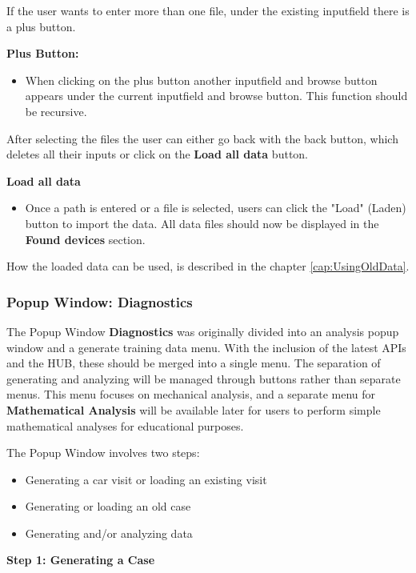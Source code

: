 \documentclass[]{scrreprt}
\begin{document}
If the user wants to enter more than one file, under the existing inputfield there is a plus button.


\textbf{Plus Button:}
\begin{itemize}
   \item When clicking on the plus button another inputfield and browse button appears under the current inputfield and browse button. This function should be recursive.
\end{itemize}


After selecting the files the user can either go back with the back button, which deletes all their inputs or click on the \textbf{Load all data} button.


\textbf{Load all data}
\begin{itemize}
    \item Once a path is entered or a file is selected, users can click the "Load" (Laden) button to import the data.
    All data files should now be displayed in the \textbf{Found devices} section.
\end{itemize}


How the loaded data can be used, is described in the chapter \ref{cap:UsingOldData}.


\subsubsection{Popup Window: Diagnostics}


The Popup Window \textbf{Diagnostics} was originally divided into an analysis popup window and a generate training data menu. With the inclusion of the latest APIs and the HUB, these should be merged into a single menu.
 The separation of generating and analyzing will be managed through buttons rather than separate menus. This menu focuses on mechanical analysis,
 and a separate menu for \textbf{Mathematical Analysis} will be available later for users to perform simple mathematical analyses for educational purposes.


The Popup Window involves two steps:


\begin{itemize}
    \item Generating a car visit or loading an existing visit
    \item Generating or loading an old case
    \item Generating and/or analyzing data
\end{itemize}


\textbf{Step 1: Generating a Case}
\end{document}
